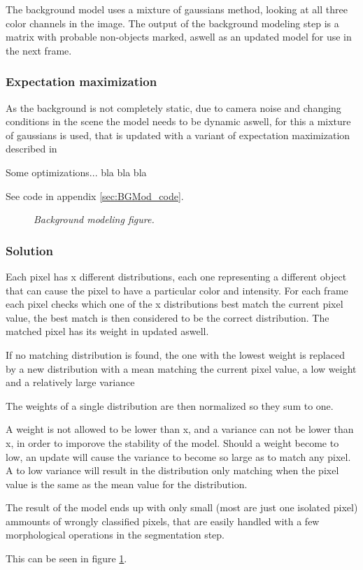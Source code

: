 The background model uses a mixture of gaussians method, looking at all three color channels in the image. The output of the background modeling step is a matrix with probable non-objects marked, aswell as an updated model for use in the next frame.

\subsubsection{Expectation maximization}

As the background is not completely static, due to camera noise and changing conditions in the scene the model needs to be dynamic aswell, for this a mixture of gaussians is used, that is updated with a variant of expectation maximization described in \cite{wood}

Some optimizations... bla bla bla

See code in appendix \ref{sec:BGMod_code}. %

\begin{figure}[htb]
	\centering
	\caption{\textit{Background modeling figure.}}
	\label{fig:BGModeling_fig} %
\end{figure}

\subsubsection{Solution}

Each pixel has x different distributions, each one representing a different object that can cause the pixel to have a particular color and intensity. For each frame each pixel checks which one of the x distributions best match the current pixel value, the best match is then considered to be the correct distribution. The matched pixel has its weight in updated aswell. 

If no matching distribution is found, the one with the lowest weight is replaced by a new distribution with a mean matching the current pixel value, a low weight and a relatively large variance

The weights of a single distribution are then normalized so they sum to one.

A weight is not allowed to be lower than x, and a variance can not be lower than x, in order to imporove the stability of the model. Should a weight become to low, an update will cause the variance to become so large as to match any pixel. A to low variance will result in the distribution only matching when the pixel value is the same as the mean value for the distribution.

The result of the model ends up with only small (most are just one isolated pixel) ammounts of wrongly classified pixels, that are easily handled with a few morphological operations in the segmentation step.

This can be seen in figure \ref{fig:BGModeling_fig}. %
